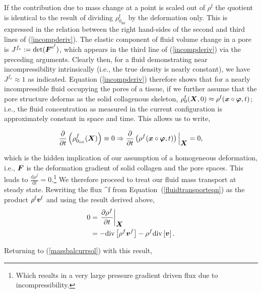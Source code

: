 If the contribution due to mass change at a point is scaled out of
$\rho^\mathrm{f}$ the quotient is identical to the result of dividing
$\rho_{0_{\mathrm{ini}}}^{\mathrm{f}}$ by the deformation only. This
is expressed in the relation between the right hand-sides of the
second and third lines of (\ref{incompderiv}). The elastic component
of fluid volume change in a pore is $J^{f_\mathrm{e}} :=
\mathrm{det}(\mbox{\boldmath$ F$}^{\mathrm{e}^{\mathrm{f}}})$, which appears in the
third line of (\ref{incompderiv}) via the preceding arguments. Clearly
then, for a fluid demonstrating near incompressibility intrinsically
(i.e., the true density is nearly constant), we have $J^{f_\mathrm{e}}
\approx 1$ as indicated. Equation (\ref{incompderiv}) therefore shows
that for a nearly incompressible fluid occupying the pores of a
tissue, if we further assume that the pore structure deforms as the
solid collagenous skeleton, $\rho_0^\mathrm{f}(\mbox{\boldmath$ X$},0) \approx
\rho^\mathrm{f}(\mbox{\boldmath$ x$}\circ\mbox{\boldmath$\varphi$},t)$; i.e., the fluid concentration as
measured in the current configuration is approximately constant in
space and time. This allows us to write,

\begin{equation}
\frac{\partial} {\partial t}\left(
\rho_{0_{\mathrm{ini}}}^{f}(\mbox{\boldmath$ X$}) \right) \equiv 0 \Rightarrow
\frac{\partial} {\partial t}\left(\rho^{f} (\mbox{\boldmath$ x$}\circ\mbox{\boldmath$\varphi$},t)
\right)\Big\vert_{\mbox{\boldmath$ X$}} = 0,
\end{equation}

\noindent which is the hidden implication of our assumption of a
homogeneous deformation, i.e., $\mbox{\boldmath$ F$}$ is the deformation gradient of
solid collagen and the pore spaces.  This leads to $\frac{\mathrm{d}
  \rho^f} {\mathrm{d} 
  t}=0$.\footnote{Which results in a very large pressure gradient
  driven flux due to incompressibility. } We
therefore proceed to treat our fluid mass transport at steady
state. Rewriting the flux $\bm^{\mathrm{f}}$ from \mbox{Equation
(\ref{fluidtransporteqn})} as the product $\rho^{\mathrm{f}}
\mbox{\boldmath$ v$}^{\mathrm{f}}$ and using the result derived above,
\begin{equation}
\begin{split}
0 &= \left. \frac{\partial \rho^f}{\partial t} \right|_{\mbox{\boldmath$ X$}}\\ &=
-\mathrm{div}\left[\rho^f \mbox{\boldmath$ v$}^{f}\right] - \rho^f
\mathrm{div}\left[\mbox{\boldmath$ v$}\right].
\end{split}
\label{incomprimpl}
\end{equation}

Returning to (\ref{massbalcurrsol}) with this result,

